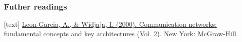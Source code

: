 \begin{frame}
	\frametitle{Futher readings}
	
	\begin{thebibliography}{9}
		
		  \href{https://www.ibr.cs.tu-bs.de/courses/ws0809/pcn/Documents/Communication_Networks-Fundamentals_Concepts_and_Key_Architectures.pdf}{Leon-Garcia, A., \& Widjaja, I. (2000). Communication networks: fundamental concepts and key architectures (Vol. 2). New York: McGraw-Hill.}
		

		
	
	
	\end{thebibliography}

\end{frame}